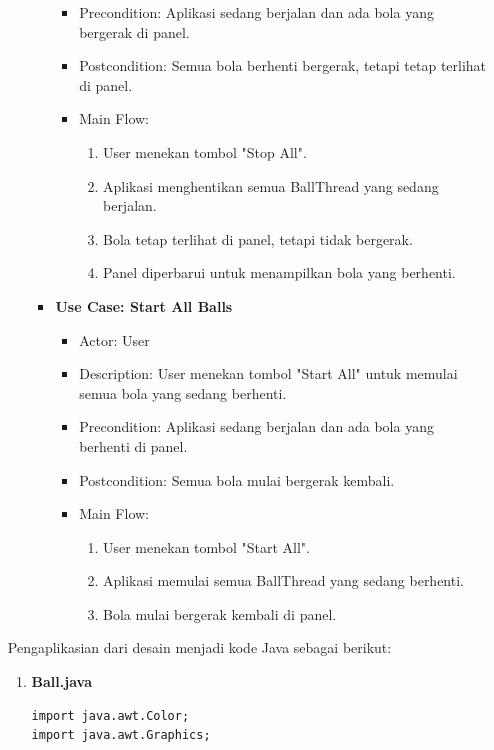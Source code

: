 \documentclass[a4paper]{article}
\begin{document}
\begin{enumerate}[itemsep=1em]
\begin{enumerate}[itemsep=1em]
\begin{itemize}
\begin{itemize}
        \item Precondition: Aplikasi sedang berjalan dan ada bola yang bergerak di panel.
        \item Postcondition: Semua bola berhenti bergerak, tetapi tetap terlihat di panel.
        \item Main Flow:
        \begin{enumerate}
          \item User menekan tombol "Stop All".
          \item Aplikasi menghentikan semua BallThread yang sedang berjalan.
          \item Bola tetap terlihat di panel, tetapi tidak bergerak.
          \item Panel diperbarui untuk menampilkan bola yang berhenti.
        \end{enumerate}
      \end{itemize}
      \item \textbf{Use Case: Start All Balls}
      \begin{itemize}
        \item Actor: User
        \item Description: User menekan tombol "Start All" untuk memulai semua bola yang sedang berhenti.
        \item Precondition: Aplikasi sedang berjalan dan ada bola yang berhenti di panel.
        \item Postcondition: Semua bola mulai bergerak kembali.
        \item Main Flow:
        \begin{enumerate}
          \item User menekan tombol "Start All".
          \item Aplikasi memulai semua BallThread yang sedang berhenti.
          \item Bola mulai bergerak kembali di panel.
        \end{enumerate}
      \end{itemize}
    \end{itemize}
  \end{enumerate}

  \vspace{1em}

  Pengaplikasian dari desain menjadi kode Java sebagai berikut:

  \begin{enumerate}[itemsep=1em]
    \item \textbf{Ball.java}
    \begin{verbatim}
import java.awt.Color;
import java.awt.Graphics;


\end{verbatim}
\end{enumerate}
\end{enumerate}
\end{document}
